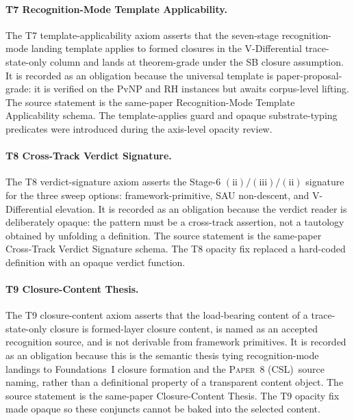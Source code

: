 \documentclass[11pt]{article}
\newcommand{\PaperCSL}{\textsc{Paper~8 (CSL)}}
\newcommand{\SigPattern}{$\mathrm{(ii)}/\mathrm{(iii)}/\mathrm{(ii)}$}
\newcommand{\LeanDecl}[1]{\texttt{\detokenize{#1}}}
\theoremstyle{definition}
\begin{document}
\paragraph{T7 Recognition-Mode Template Applicability.}
The T7 template-applicability axiom asserts that the seven-stage
recognition-mode landing template applies
to formed closures in the V-Differential trace-state-only column and
lands at theorem-grade under the SB closure assumption.  It is recorded
as an obligation because the universal template is paper-proposal-grade:
it is verified on the PvNP and RH instances but awaits corpus-level
lifting.  The source statement is the same-paper Recognition-Mode
Template Applicability schema.  The template-applies guard and opaque
substrate-typing predicates were introduced during the axis-level
opacity review.

\paragraph{T8 Cross-Track Verdict Signature.}
The T8 verdict-signature axiom asserts the Stage-6 \SigPattern{}
signature for the three sweep options:
framework-primitive, SAU non-descent, and V-Differential elevation.  It
is recorded as an obligation because the verdict reader is deliberately
opaque: the pattern must be a cross-track assertion, not a tautology
obtained by unfolding a definition.  The source statement is the
same-paper Cross-Track Verdict Signature schema.  The T8 opacity fix
replaced a hard-coded \LeanDecl{sweepVerdict} definition with an
opaque verdict function.

\paragraph{T9 Closure-Content Thesis.}
The T9 closure-content axiom asserts that the load-bearing content of a
trace-state-only closure is
formed-layer closure content, is named as an accepted recognition
source, and is not derivable from framework primitives.  It is recorded
as an obligation because this is the semantic thesis tying
recognition-mode landings to Foundations~I closure formation and the
\PaperCSL\ source naming, rather than a definitional property of a
transparent content object.  The source statement is the same-paper
Closure-Content Thesis.  The T9 opacity fix made
\LeanDecl{loadBearingFor} opaque so these conjuncts cannot be baked
into the selected content.
\end{document}
